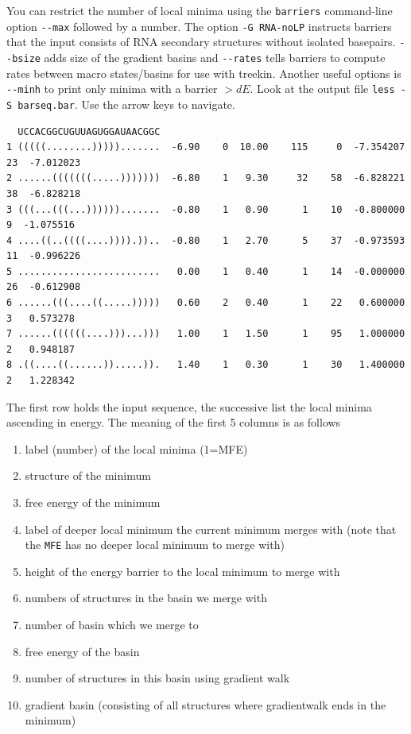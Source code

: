 \documentclass[]{article}
\providecommand{\tightlist}{%
  \setlength{\itemsep}{0pt}\setlength{\parskip}{0pt}}
\begin{document}
You can restrict the number of local minima using the \texttt{barriers}
command-line option \texttt{-\/-max} followed by a number. The option
\texttt{-G\ RNA-noLP} instructs barriers that the input consists of RNA
secondary structures without isolated basepairs. \texttt{-\/-bsize} adds
size of the gradient basins and \texttt{-\/-rates} tells barriers to
compute rates between macro states/basins for use with treekin. Another
useful options is \texttt{-\/-minh} to print only minima with a barrier
\(> dE\). Look at the output file \texttt{less\ -S\ barseq.bar}. Use the
arrow keys to navigate.

\begin{verbatim}
  UCCACGGCUGUUAGUGGAUAACGGC
1 (((((........))))).......  -6.90    0  10.00    115     0  -7.354207     23  -7.012023
2 ......(((((((.....)))))))  -6.80    1   9.30     32    58  -6.828221     38  -6.828218
3 (((...(((...)))))).......  -0.80    1   0.90      1    10  -0.800000      9  -1.075516
4 ....((..((((....)))).))..  -0.80    1   2.70      5    37  -0.973593     11  -0.996226
5 .........................   0.00    1   0.40      1    14  -0.000000     26  -0.612908
6 ......(((....((.....)))))   0.60    2   0.40      1    22   0.600000      3   0.573278
7 ......((((((....)))...)))   1.00    1   1.50      1    95   1.000000      2   0.948187
8 .((....((......)).....)).   1.40    1   0.30      1    30   1.400000      2   1.228342
\end{verbatim}

The first row holds the input sequence, the successive list the local
minima ascending in energy. The meaning of the first 5 columns is as
follows

\begin{enumerate}
\def\labelenumi{\arabic{enumi}.}
\tightlist
\item
  label (number) of the local minima (1=MFE)
\item
  structure of the minimum
\item
  free energy of the minimum
\item
  label of deeper local minimum the current minimum merges with (note
  that the \texttt{MFE} has no deeper local minimum to merge with)
\item
  height of the energy barrier to the local minimum to merge with
\item
  numbers of structures in the basin we merge with
\item
  number of basin which we merge to
\item
  free energy of the basin
\item
  number of structures in this basin using gradient walk
\item
  gradient basin (consisting of all structures where gradientwalk ends
  in the minimum)
\end{enumerate}
\end{document}
